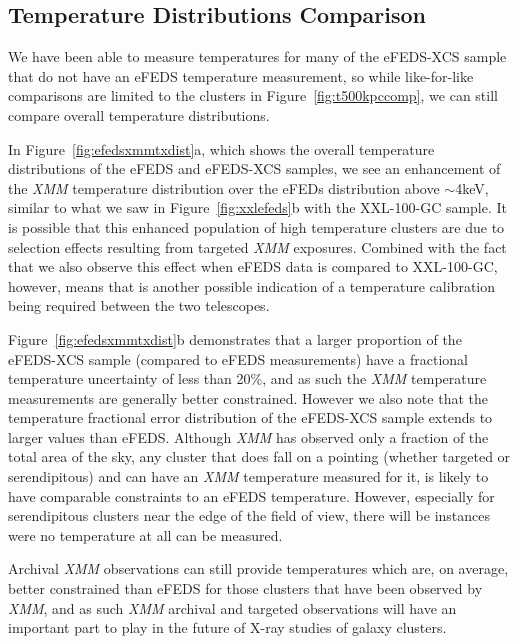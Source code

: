 \documentclass[fleqn,usenatbib]{mnras}
\begin{document}
\subsection{Temperature Distributions Comparison}
We have been able to measure temperatures for many of the eFEDS-XCS sample that do not have an eFEDS temperature measurement, so while like-for-like comparisons are limited to the clusters in Figure~\ref{fig:t500kpccomp}, we can still compare overall temperature distributions.

In Figure~\ref{fig:efedsxmmtxdist}a, which shows the overall temperature distributions of the eFEDS and eFEDS-XCS samples, we see an enhancement of the {\em XMM} temperature distribution over the eFEDs distribution above ${\sim}$4keV, similar to what we saw in Figure~\ref{fig:xxlefeds}b with the XXL-100-GC sample. It is possible that this enhanced population of high temperature clusters are due to selection effects resulting from targeted {\em XMM} exposures. Combined with the fact that we also observe this effect when eFEDS data is compared to XXL-100-GC, however, means that is another possible indication of a temperature calibration being required between the two telescopes.

Figure~\ref{fig:efedsxmmtxdist}b demonstrates that a larger proportion of the eFEDS-XCS sample (compared to eFEDS measurements) have a fractional temperature uncertainty of less than 20\%, and as such the {\em XMM} temperature measurements are generally better constrained. However we also note that the temperature fractional error distribution of the eFEDS-XCS sample extends to larger values than eFEDS. Although {\em XMM} has observed only a fraction of the total area of the sky, any cluster that does fall on a pointing (whether targeted or serendipitous) and can have an {\em XMM} temperature measured for it, is likely to have comparable constraints to an eFEDS temperature. However, especially for serendipitous clusters near the edge of the field of view, there will be instances were no temperature at all can be measured.

Archival {\em XMM} observations can still provide temperatures which are, on average, better constrained than eFEDS for those clusters that have been observed by {\em XMM}, and as such {\em XMM} archival and targeted observations will have an important part to play in the future of X-ray studies of galaxy clusters.
\end{document}
